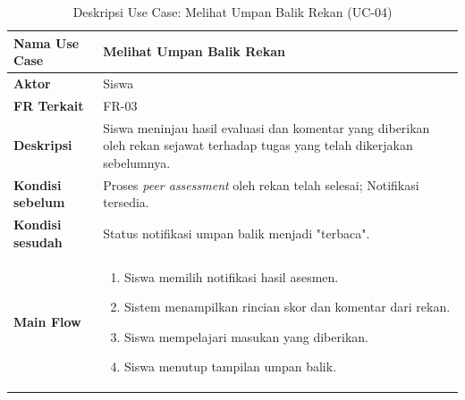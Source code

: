 \begin{table}[H]
    \centering
    \caption{Deskripsi Use Case: Melihat Umpan Balik Rekan (UC-04)}
    \label{tbl:desc_uc04}
    \begin{tabular}{|p{}|p{}|}
        \hline
        \textbf{Nama Use Case} & \textbf{Melihat Umpan Balik Rekan} \\
        \hline
        \textbf{Aktor} & Siswa \\
        \hline
        \textbf{FR Terkait} & FR-03 \\
        \hline
        \textbf{Deskripsi} & Siswa meninjau hasil evaluasi dan komentar yang diberikan oleh rekan sejawat terhadap tugas yang telah dikerjakan sebelumnya. \\
        \hline
        \textbf{Kondisi sebelum} & Proses \textit{peer assessment} oleh rekan telah selesai; Notifikasi tersedia. \\
        \hline
        \textbf{Kondisi sesudah} & Status notifikasi umpan balik menjadi "terbaca". \\
        \hline
        \textbf{Main Flow} & \begin{enumerate}[noitemsep,topsep=0pt,leftmargin=*]
            \item Siswa memilih notifikasi hasil asesmen.
            \item Sistem menampilkan rincian skor dan komentar dari rekan.
            \item Siswa mempelajari masukan yang diberikan.
            \item Siswa menutup tampilan umpan balik.
        \end{enumerate} \\
        \hline
    \end{tabular}
\end{table}